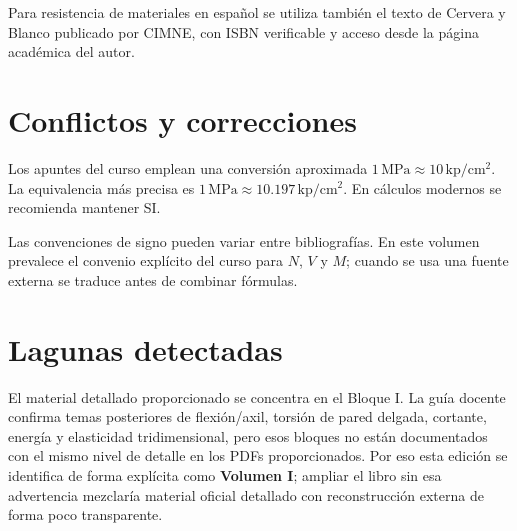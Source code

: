 Para resistencia de materiales en español se utiliza también el texto de Cervera y Blanco publicado por CIMNE, con ISBN verificable y acceso desde la página académica del autor.\autocite{cervera2015}

\section{Conflictos y correcciones}
\begin{warningbox}
Los apuntes del curso emplean una conversión aproximada $1\,\mathrm{MPa}\approx10\,\mathrm{kp/cm^2}$. La equivalencia más precisa es $1\,\mathrm{MPa}\approx10.197\,\mathrm{kp/cm^2}$. En cálculos modernos se recomienda mantener SI.
\end{warningbox}

Las convenciones de signo pueden variar entre bibliografías. En este volumen prevalece el convenio explícito del curso para $N$, $V$ y $M$; cuando se usa una fuente externa se traduce antes de combinar fórmulas.

\section{Lagunas detectadas}
El material detallado proporcionado se concentra en el Bloque I. La guía docente confirma temas posteriores de flexión/axil, torsión de pared delgada, cortante, energía y elasticidad tridimensional, pero esos bloques no están documentados con el mismo nivel de detalle en los PDFs proporcionados. Por eso esta edición se identifica de forma explícita como \textbf{Volumen I}; ampliar el libro sin esa advertencia mezclaría material oficial detallado con reconstrucción externa de forma poco transparente.
